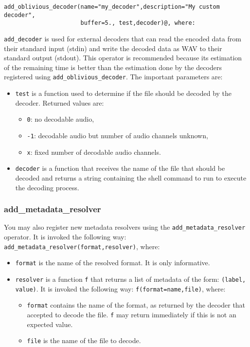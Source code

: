 \begin{verbatim}
add_oblivious_decoder(name="my_decoder",description="My custom decoder",
                      buffer=5., test,decoder)@, where:
\end{verbatim}
\verb+add_decoder+ is used for external decoders that can read the encoded data from their standard
input (stdin) and write the decoded data as WAV to their standard output (stdout). This operator
is recommended because its estimation of the remaining time is better than the estimation done
by the decoders registered using \verb+add_oblivious_decoder+. The important parameters are:

\begin{itemize}
\item \verb+test+ is a function used to determine if the file should be decoded by the decoder. Returned values are: \begin{itemize}
\item \verb+0+: no decodable audio,
\item \verb+-1+: decodable audio but number of audio channels unknown,
\item \verb+x+: fixed number of decodable audio channels.

\end{itemize}

\item \verb+decoder+ is a function that receives the name of the file that should be decoded and returns a string containing the shell command to run to execute the decoding process.

\end{itemize}
\subsubsection{add\_metadata\_resolver}
You may also register new metadata resolvers using the \verb+add_metadata_resolver+ operator. It is invoked the
following way: \verb+add_metadata_resolver(format,resolver)+, where:

\begin{itemize}
\item \verb+format+ is the name of the resolved format. It is only informative.
\item \verb+resolver+ is a function \verb+f+ that returns a list of metadata of
  the form: \verb+(label, value)+. It is invoked the following way:
  \verb+f(format=name,file)+, where:\begin{itemize}
  \item \verb+format+ contains the name of the format, as returned by the
    decoder that accepted to decode the file. \verb+f+ may return immediately if
    this is not an expected value.
  \item \verb+file+ is the name of the file to decode.
\end{itemize}
\end{itemize}


